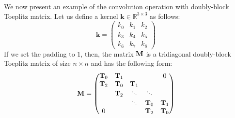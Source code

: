 We now present an example of the convolution operation with doubly-block Toeplitz matrix.
Let us define a kernel $\mathbf{k} \in \mathbb{R}^{3\times3}$ as follows:
\begin{equation}
    \mathbf{k} = \begin{pmatrix}
        k_{0} & k_{1} & k_{2} \\
        k_{3} & k_{4} & k_{5} \\
        k_{6} & k_{7} & k_{8} 
    \end{pmatrix}
\end{equation}
If we set the padding to 1, then, the matrix $\mathbf{M}$ is a tridiagonal doubly-block Toeplitz matrix of size $n \times n$ and has the following form:
\begin{equation}
    \Mmat = \begin{pmatrix}
    \Tmat_0 & \Tmat_{1} &  &  & 0  \\
    \Tmat_{2} & \Tmat_0 & \Tmat_{1} &  &  \\
     & \Tmat_{2} & \scalebox{.70}{$\ddots$} & \scalebox{.70}{$\ddots$} &   \\
     &  & \scalebox{.70}{$\ddots$} & \Tmat_0 & \Tmat_{1}  \\
    0 &  &  & \Tmat_{2} & \Tmat_0  \\
    \end{pmatrix}
    \label{equation:operator_matrix}
\end{equation}


